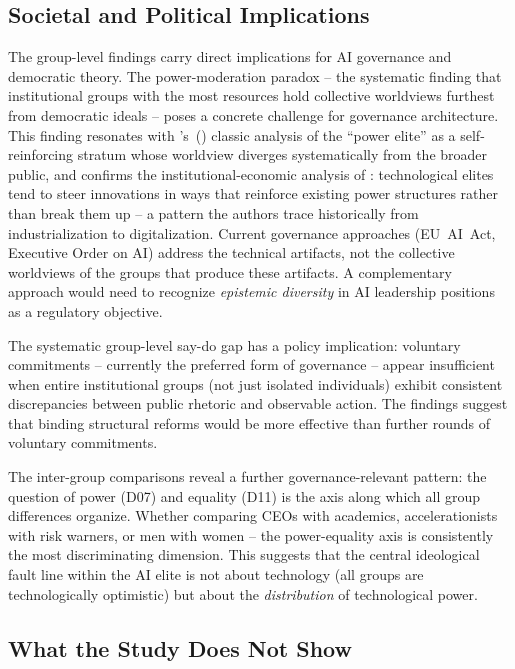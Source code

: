 \documentclass[12pt,a4paper]{article}
\begin{document}
\subsection{Societal and Political Implications}
\label{sec:diskussion:implikationen}

The group-level findings carry direct implications for AI governance and democratic theory. The power-moderation paradox -- the systematic finding that institutional groups with the most resources hold collective worldviews furthest from democratic ideals -- poses a concrete challenge for governance architecture. This finding resonates with \citeauthor{Mills1956}'s~(\citeyear{Mills1956}) classic analysis of the ``power elite'' as a self-reinforcing stratum whose worldview diverges systematically from the broader public, and confirms the institutional-economic analysis of \citet{AcemogluJohnson2023}: technological elites tend to steer innovations in ways that reinforce existing power structures rather than break them up -- a pattern the authors trace historically from industrialization to digitalization. Current governance approaches (EU~AI~Act, Executive Order on AI) address the technical artifacts, not the collective worldviews of the groups that produce these artifacts. A complementary approach would need to recognize \emph{epistemic diversity} in AI leadership positions as a regulatory objective.

The systematic group-level say-do gap has a policy implication: voluntary commitments -- currently the preferred form of governance \citep[cf.][]{Bengio2024} -- appear insufficient when entire institutional groups (not just isolated individuals) exhibit consistent discrepancies between public rhetoric and observable action. The findings suggest that binding structural reforms would be more effective than further rounds of voluntary commitments.

The inter-group comparisons reveal a further governance-relevant pattern: the question of power (D07) and equality (D11) is the axis along which all group differences organize. Whether comparing CEOs with academics, accelerationists with risk warners, or men with women -- the power-equality axis is consistently the most discriminating dimension. This suggests that the central ideological fault line within the AI elite is not about technology (all groups are technologically optimistic) but about the \emph{distribution} of technological power.


\subsection{What the Study Does Not Show}
\label{sec:diskussion:negativ}
\end{document}
